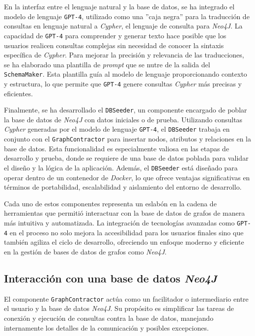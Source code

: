 En la interfaz entre el lenguaje natural y la base de datos, se ha integrado el modelo de lenguaje \texttt{GPT-4}, utilizado como una ''caja negra'' para la traducción de consultas en lenguaje natural a \textit{Cypher}, el lenguaje de consulta para \textit{Neo4J}. La capacidad de \texttt{GPT-4} para comprender y generar texto hace posible que los usuarios realicen consultas complejas sin necesidad de conocer la sintaxis específica de \textit{Cypher}. Para mejorar la precisión y relevancia de las traducciones, se ha elaborado una plantilla de \textit{prompt} que se nutre de la salida del \texttt{SchemaMaker}. Esta plantilla guía al modelo de lenguaje proporcionando contexto y estructura, lo que permite que \texttt{GPT-4} genere consultas \textit{Cypher} más precisas y eficientes.

Finalmente, se ha desarrollado el \texttt{DBSeeder}, un componente encargado de poblar la base de datos de \textit{Neo4J} con datos iniciales o de prueba. Utilizando consultas \textit{Cypher} generadas por el modelo de lenguaje \texttt{GPT-4}, el \texttt{DBSeeder} trabaja en conjunto con el \texttt{GraphContractor} para insertar nodos, atributos y relaciones en la base de datos. Esta funcionalidad es especialmente valiosa en las etapas de desarrollo y prueba, donde se requiere de una base de datos poblada para validar el diseño y la lógica de la aplicación. Además, el \texttt{DBSeeder} está diseñado para operar dentro de un contenedor de \textit{Docker}, lo que ofrece ventajas significativas en términos de portabilidad, escalabilidad y aislamiento del entorno de desarrollo.

Cada uno de estos componentes representa un eslabón en la cadena de herramientas que permitió interactuar con la base de datos de grafos de manera más intuitiva y automatizada. La integración de tecnologías avanzadas como \texttt{GPT-4} en el proceso no solo mejora la accesibilidad para los usuarios finales sino que también agiliza el ciclo de desarrollo, ofreciendo un enfoque moderno y eficiente en la gestión de bases de datos de grafos como \textit{Neo4J}.

\subsection{Interacción con una base de datos \textit{Neo4J}} \label{graph_contractor}

El componente \texttt{GraphContractor} actúa como un facilitador o intermediario entre el usuario y la base de datos \textit{Neo4J}. Su propósito es simplificar las tareas de conexión y ejecución de consultas contra la base de datos, manejando internamente los detalles de la comunicación y posibles excepciones.

